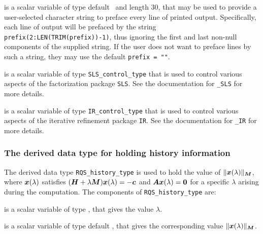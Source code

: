 \documentclass{galahad}
\newcommand{\packagename}{RQS}
\begin{document}
\begin{description}
 is a scalar variable of type default \character\
and length 30, that may be used to provide a user-selected
character string to preface every line of printed output.
Specifically, each line of output will be prefaced by the string
{\tt prefix(2:LEN(TRIM(prefix))-1)},
thus ignoring the first and last non-null components of the
supplied string. If the user does not want to preface lines by such
a string, they may use the default {\tt prefix = ""}.

 is a scalar variable of type
{\tt SLS\_control\_type} that is used to control various aspects of the
factorization package {\tt SLS}. See the documentation for
{\tt \libraryname\_SLS} for more details.

 is a scalar variable of type
{\tt IR\_control\_type} that is used to control various aspects of the
iterative refinement package {\tt IR}. See the documentation for
{\tt \libraryname\_IR} for more details.

\end{description}


\subsubsection{The derived data type for holding history
 information}\label{typehist}
The derived data type
{\tt \packagename\_history\_type}
is used to hold the value of $\|{\bm{x}}(\lambda)\|_{{\bm{M}}}$, where
${\bm{x}}(\lambda)$ satisfies
$({\bm{H}} + \lambda {\bm{M}}){\bm{x}}(\lambda) = - {\bm{c}}$ and ${\bm{A}}{\bm{x}}(\lambda) = {\bm{0}}$
for a specific $\lambda$ arising during the computation.
The components of
{\tt \packagename\_history\_type}
are:
\begin{description}
 is a scalar variable of type \realdp, that gives
 the value $\lambda$.

 is a scalar variable of type default \real, that gives
 the corresponding value $\|{\bm{x}}(\lambda)\|_{{\bm{M}}}$.

\end{description}

\end{document}
